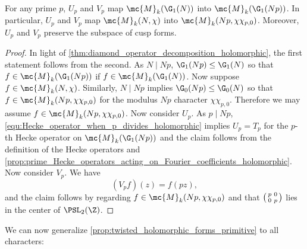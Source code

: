     \begin{lemma}\label{lem:twisted_holomorphic_lemma}
      For any prime $p$, $U_{p}$ and $V_{p}$ map $\mc{M}_{k}(\G_{1}(N))$ into $\mc{M}_{k}(\G_{1}(Np))$. In particular, $U_{p}$ and $V_{p}$ map $\mc{M}_{k}(N,\chi)$ into $\mc{M}_{k}(Np,\chi\chi_{p,0})$. Moreover, $U_{p}$ and $V_{p}$ preserve the subspace of cusp forms.
    \end{lemma}
    \begin{proof}
      In light of \cref{thm:diamond_operator_decomposition_holomorphic}, the first statement follows from the second. As $N \mid Np$, $\G_{1}(Np) \le \G_{1}(N)$ so that $f \in \mc{M}_{k}(\G_{1}(Np))$ if $f \in \mc{M}_{k}(\G_{1}(N))$. Now suppose $f \in \mc{M}_{k}(N,\chi)$. Similarly, $N \mid Np$ implies $\G_{0}(Np) \le \G_{0}(N)$ so that $f \in \mc{M}_{k}(Np,\chi\chi_{p,0})$ for the modulus $Np$ character $\chi\chi_{p,0}$. Therefore we may assume $f \in \mc{M}_{k}(Np,\chi\chi_{p,0})$. Now consider $U_{p}$. As $p \mid Np$, \cref{equ:Hecke_operator_when_p_divides_holomorphic} implies $U_{p} = T_{p}$ for the $p$-th Hecke operator on $\mc{M}_{k}(\G_{1}(Np))$ and the claim follows from the definition of the Hecke operators and \cref{prop:prime_Hecke_operators_acting_on_Fourier_coefficients_holomorphic}. Now consider $V_{p}$. We have
      \[
        (V_{p}f)(z) = f(pz),
      \]
      and the claim follows by regarding $f \in \mc{M}_{k}(Np,\chi\chi_{p,0})$ and that $\begin{psmallmatrix} p & 0 \\ 0 & p \end{psmallmatrix}$ lies in the center of $\PSL_{2}(\Z)$.
    \end{proof}

    We can now generalize \cref{prop:twisted_holomorphic_forms_primitive} to all characters:

